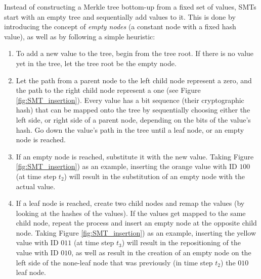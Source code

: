 \documentclass{article}
\begin{document}
Instead of constructing a Merkle tree bottom-up from a fixed set of values, SMTs start with an empty tree and sequentially add values to it. This is done by introducing the concept of \textit{empty nodes} (a constant node with a fixed hash value), as well as by following a simple heuristic: 
\begin{enumerate}
 \item To add a new value to the tree, begin from the tree root. If there is no value yet in the tree, let the tree root be the empty node.
 \item Let the path from a parent node to the left child node represent a zero, and the path to the right child node represent a one (see Figure \ref{fig:SMT_insertion}). Every value has a bit sequence (their cryptographic hash) that can be mapped onto the tree by sequentially choosing either the left side, or right side of a parent node, depending on the bits of the value's hash. Go down the value's path in the tree until a leaf node, or an empty node is reached.
 \item If an empty node is reached, substitute it with the new value. Taking Figure \ref{fig:SMT_insertion}) as an example, inserting the orange value with ID $100$ (at time step $t_2$) will result in the substitution of an empty node with the actual value.
 \item If a leaf node is reached, create two child nodes and remap the values (by looking at the hashes of the values). If the values get mapped to the same child node, repeat the process and insert an empty node at the opposite child node. Taking Figure \ref{fig:SMT_insertion}) as an example, inserting the yellow value with ID $011$ (at time step $t_3$) will result in the repositioning of the value with ID $010$, as well as result in the creation of an empty node on the left side of the none-leaf node that was previously (in time step $t_2$) the $010$ leaf node.
\end{enumerate}
\end{document}
